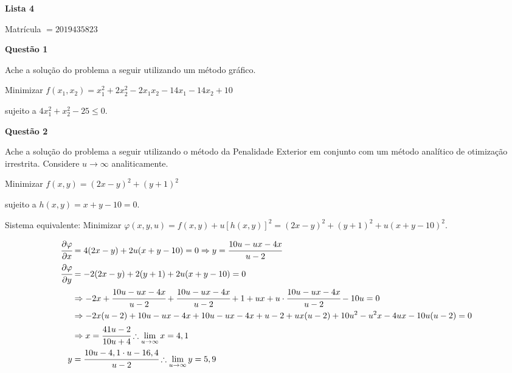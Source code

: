 \documentclass{rbfin}
\begin{document}
\rbfe{}

\begin{center}
\Large

\textbf{Lista 4}

\normalsize

Matrícula $= 2019435823$
\end{center}

\large

\textbf{Questão 1}

\normalsize

\vspace{6mm}

\doublespacing

Ache a solução do problema a seguir utilizando um método gráfico.

Minimizar $f(x_1, x_2 ) = x_1^2 + 2x_2^2 -2x_1x_2 - 14x_1 - 14x_2 + 10$

sujeito a $4x_1^2 + x_2^2 - 25 \le 0$.

\singlespacing

\vspace{6mm}

\large

\textbf{Questão 2}

\normalsize

\vspace{6mm}

\doublespacing

Ache a solução do problema a seguir utilizando o método da Penalidade Exterior
em conjunto com um método analítico de otimização irrestrita. Considere $u\to \infty$
analiticamente.

Minimizar $f(x,y) = (2x-y)^2+(y+1)^2$

sujeito a $h(x,y) = x+y - 10 = 0$.

Sistema equivalente: Minimizar $\varphi(x,y,u) = f(x,y) + u [h(x,y)]^2 = (2x-y)^2+(y+1)^2 + u (x+y - 10)^2$.

\begin{align*}
\cfrac{\partial \varphi}{\partial x} &= 4(2x-y) + 2u(x+y - 10) = 0 \Rightarrow y = \cfrac{10u - ux - 4x}{u - 2}\\
\cfrac{\partial \varphi}{\partial y} &= -2(2x-y) + 2(y+1) + 2u (x+y - 10) = 0\\
&\Rightarrow - 2x + \cfrac{10u - ux - 4x}{u - 2} + \cfrac{10u - ux - 4x}{u - 2}+1 + ux+ u\cdot \cfrac{10u - ux - 4x}{u - 2} - 10u = 0\\
&\Rightarrow - 2x(u - 2) + 10u - ux - 4x + 10u - ux - 4x + u - 2 + ux(u - 2) + 10u^2 - u^2x - 4ux - 10u(u - 2) = 0\\
&\Rightarrow x = \cfrac{41u - 2}{10u + 4} \therefore \lim_{u \to \infty} x = 4,1\\
y &= \cfrac{10u - 4,1 \cdot u - 16,4}{u - 2} \therefore \lim_{u \to \infty} y = 5,9
\end{align*}
\end{document}
